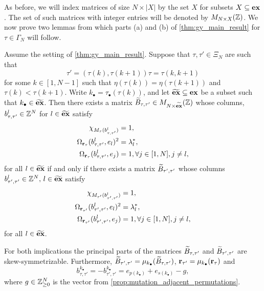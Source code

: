 As before, we will index matrices of size $N \times |X|$ by the set $X$ for subsets $X
	\subseteq \mathbf{ex}$. The set of such matrices with integer entries will be denoted by $M_{N
			\times X}(\mathbb{Z})$. We now prove two lemmas from which parts (a) and (b) of
\cref{thm:gy_main_result} for $\tau \in \Gamma_N$ will follow.

\begin{lemma}\label{lem:inductive_step_btautau}
	Assume the setting of \cref{thm:gy_main_result}. Suppose that $\tau, \tau' \in \Xi_N$ are such that
	\begin{equation*}
		\tau' = (\tau(k), \tau(k+1))\tau = \tau(k, k+1)
	\end{equation*}
	for some $k \in [1, N-1]$ such that $\eta(\tau(k)) = \eta(\tau(k+1))$ and $\tau(k) <
		\tau(k+1)$. Write $k_\bullet = \tau_\bullet(\tau(k))$, and let $\widetilde{\mathbf{ex}} \subseteq \mathbf{ex}$
	be a subset such that $k_\bullet \in \widetilde{\mathbf{ex}}$. Then there exists a matrix $\widetilde{B}_{\tau,
			\tau'} \in M_{N \times \widetilde{\mathbf{ex}}}(\mathbb{Z})$ whose columns, $b^l_{\tau, \tau'} \in \mathbb{Z}^N$
	for $l \in \widetilde{\mathbf{ex}}$ satisfy
	\begin{equation}\label{eq:conditions_for_bltautau'}
		\begin{aligned}
			\chi_{M_\tau(b^l_{\tau, {\tau'}})}            & = 1,                                \\
			\Omega_{\mathbf{r}_\tau}(b^l_{\tau,{\tau'}}, e_l)^2 & = \lambda^*_l,                      \\
			\Omega_{\mathbf{r}_\tau}(b^l_{\tau,{\tau'}}, e_j)   & = 1, \forall j \in [1, N], j\neq l,
		\end{aligned}
	\end{equation}
	for all $l \in \widetilde{\mathbf{ex}}$ if and only if there exists a matrix $\widetilde{B}_{\tau', \tau'}$
	whose columns $b^l_{\tau', \tau'} \in \mathbb{Z}^N,\,l\in \widetilde{\mathbf{ex}}$ satisfy
	\begin{equation*}
		\begin{aligned}
			\chi_{M_{\tau'}(b^l_{{\tau'}, {\tau'}})}            & = 1,                                \\
			\Omega_{\mathbf{r}_{\tau'}}(b^l_{{\tau'},{\tau'}}, e_l)^2 & = \lambda^*_l,                      \\
			\Omega_{\mathbf{r}_{\tau'}}(b^l_{{\tau'},{\tau'}}, e_j)   & = 1, \forall j \in [1, N], j\neq l,
		\end{aligned}
	\end{equation*}
	for all $l \in \widetilde{\mathbf{ex}}$.

	For both implications the principal parts of the matrices $\widetilde{B}_{\tau, \tau'}$ and
	$\widetilde{B}_{\tau' ,\tau'}$ are skew-symmetrizable. Furthermore, $\widetilde{B}_{\tau', \tau'} =
		\mu_{k_\bullet}(\widetilde{B}_{\tau, \tau'})$, $\mathbf{r}_{\tau'} = \mu_{k_\bullet}(\mathbf{r}_{\tau})$ and
	\begin{equation*}
		b^{k_\bullet}_{\tau, \tau'} = - b^{k_\bullet}_{\tau', \tau'} = e_{p(k_\bullet)} + e_{s(k_\bullet)} - g,
	\end{equation*}
	where $g\in \mathbb{Z}_{\geq 0}^N$ is the vector from
	\cref{prop:mutation_adjacent_permutations}.
\end{lemma}
